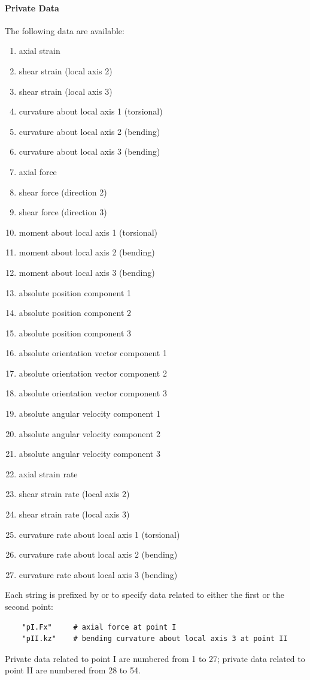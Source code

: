 \paragraph{Private Data}
\label{sec:EL:BEAM:PRIVATE}
The following data are available:
\begin{enumerate}
\item {} axial strain
\item {} shear strain (local axis 2)
\item {} shear strain (local axis 3)
\item {} curvature about local axis 1 (torsional)
\item {} curvature about local axis 2 (bending)
\item {} curvature about local axis 3 (bending)
\item {} axial force
\item {} shear force (direction 2)
\item {} shear force (direction 3)
\item {} moment about local axis 1 (torsional)
\item {} moment about local axis 2 (bending)
\item {} moment about local axis 3 (bending)
\item {} absolute position component 1
\item {} absolute position component 2
\item {} absolute position component 3
\item {} absolute orientation vector component 1
\item {} absolute orientation vector component 2
\item {} absolute orientation vector component 3
\item {} absolute angular velocity component 1
\item {} absolute angular velocity component 2
\item {} absolute angular velocity component 3
\item {} axial strain rate
\item {} shear strain rate (local axis 2)
\item {} shear strain rate (local axis 3)
\item {} curvature rate about local axis 1 (torsional)
\item {} curvature rate about local axis 2 (bending)
\item {} curvature rate about local axis 3 (bending)
\end{enumerate}
Each string is prefixed by  or 
to specify data related to either the first or the second point:
\begin{verbatim}
    "pI.Fx"     # axial force at point I
    "pII.kz"    # bending curvature about local axis 3 at point II
\end{verbatim}
Private data related to point I are numbered from 1 to 27;
private data related to point II are numbered from 28 to 54.



